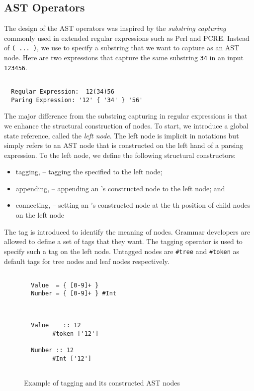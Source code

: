 \documentclass[JIP]{ipsj}
\begin{document}
\subsection{AST Operators}

The design of the AST operators was inspired by the {\em substring capturing} commonly used in extended regular expressions such as Perl and PCRE\cite{Pcre}. Instead of \verb|( ... )|, we use  to specify a substring that  we want to capture as an AST node. Here are two expressions that capture the same substring \verb|34| in an input \verb|123456|.

{\small \begin{verbatim}

  Regular Expression:  12(34)56
  Paring Expression: '12' { '34' } '56'

\end{verbatim}}

The major difference from the substring capturing in regular expressions is that we enhance the structural construction of nodes. To start, we introduce a global state reference, called the {\em left node}. The left node is implicit in notations but simply refers to an AST node that is constructed on the left hand of a parsing expression. To the left node, we define the following structural constructors:
 
\begin{itemize}
\item tagging,  -- tagging the specified  to the left node;
\item appending,  -- appending an 's constructed node to the left node; and
\item connecting,  -- setting an 's constructed node at the th position of child nodes on the left node
\end{itemize}

The tag  is introduced to identify the meaning of nodes. Grammar developers are allowed to define a set of tags that they want. The tagging operator is used to specify such a tag on the left node. Untagged nodes are \verb|#tree| and \verb|#token| as default tags for tree nodes and leaf nodes respectively. 

\begin{figure}[tb]
{\small \begin{framed} \begin{verbatim}

  Value  = { [0-9]+ }
  Number = { [0-9]+ } #Int
  
\end{verbatim} \end{framed} }

{\small \begin{verbatim}

  Value    :: 12
        #token ['12']

  Number :: 12
        #Int ['12']
  
\end{verbatim}}
\caption{Example of tagging and its constructed AST nodes}
\label{fig:tagging}
\end{figure}
\end{document}
